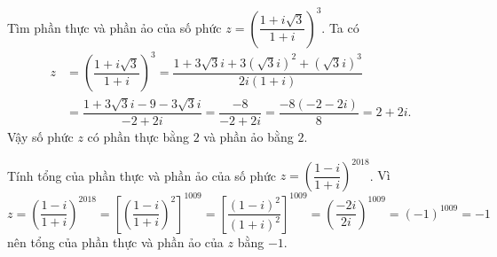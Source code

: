 \begin{vd}%
	Tìm phần thực và phần ảo của số phức $z = \left(\dfrac{1+i\sqrt{3}}{1+i}\right)^3$.
	\loigiai
	{
		Ta có
		\begin{align*}
		z &= \left(\dfrac{1+i\sqrt{3}}{1+i}\right)^3 = \dfrac{1+3\sqrt{3}i+3(\sqrt{3}i)^2+(\sqrt{3}i)^3}{2i(1+i)} \\
		&= \dfrac{1+3\sqrt{3}i-9-3\sqrt{3}i}{-2+2i} = \dfrac{-8}{-2+2i} = \dfrac{-8(-2-2i)}{8} = 2+2i.
		\end{align*}
		Vậy số phức $z$ có phần thực bằng $2$ và phần ảo bằng $2$.
	}
\end{vd}

\begin{vd}%
	Tính tổng của phần thực và phần ảo của số phức $z = \left(\dfrac{1-i}{1+i}\right)^{2018}$.
	\loigiai 
	{
		Vì $z = \left(\dfrac{1-i}{1+i}\right)^{2018} = \left[\left(\dfrac{1-i}{1+i}\right)^2\right]^{1009} = \left[\dfrac{(1-i)^2}{(1+i)^2}\right]^{1009} = \left(\dfrac{-2i}{2i}\right)^{1009} = (-1)^{1009} = -1$ nên tổng của phần thực và phần ảo của $z$ bằng $-1.$
	}
\end{vd}

